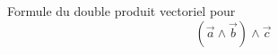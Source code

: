 Formule du double produit vectoriel pour
\[(\vec{a}\wedge \vec{b}) \wedge \vec{c}\] \bigskip \bigskip